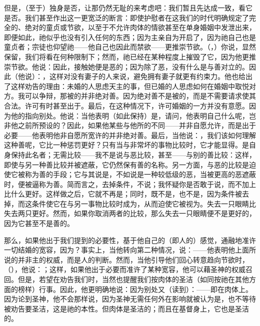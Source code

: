 但是，（至于）独身是否，让那仍然无耻的来考虑吧：我们暂且先达成一致，看它是否。我们甚至作出这一更宽泛的断言：即使护慰者在这我们的时代明确规定了完全的、绝对的童贞或节欲，以至于不允许肉体的情欲甚至在单身婚姻中发泄出来，即便如此，祂似乎也没有引入任何的东西；因为主亲自为开启了，因为祂自己也是童贞者；宗徒也仰望祂——他自己也因此而禁欲——更推崇节欲。（，）你说，显然保留，我们将看在何种限制下；然而，祂已经在某种程度上摧毁了它，因为他更推崇节欲。他说：因此，接触她便是恶的；因为除了恶，没有什么是与善对立的。因此（他说）：，这样对没有妻子的人来说，避免拥有妻子就更有约束力。他也给出了这样劝告的理由：未婚的人思虑天主的事，但已婚的人思虑如何在婚姻中取悦对方。我可以争辩，那被的并非绝对善。因为绝对善不是被的，而是不需要请求使其合法。许可有时甚至出于。最后，在这种情况下，许可婚姻的一方并没有意愿。因为他的指向别处。他说：当他表明（如此保持）是，请问，他表明自己什么呢，岂非他之前所预设的？因此，如果他某些与他所的不同——并非自愿允许，而是出于必要——他表明他非自愿所宽许的并非绝对善。最后，当他说：，我们该如何理解这种善呢，它比一种惩罚更好？只有当与非常坏的事物比较时，它才能显得。是自身保持此名者；无需比较——我不是说与恶比较，甚至——与别的善比较：这样，即使与另一种善比较并被遮蔽，它仍然保有善的名称。另一方面，与恶的比较是迫使它被称为善的手段；它与其说是，不如说是一种较低级的恶，当被更高的恶遮蔽时，便被逼称为善。简而言之，去掉条件，不说；我怀疑你是否敢于说，而不加上比什么更好。这样做之后，它就不再是；同时，既不是，也不是，因为条件被去掉，而这条件使它在与另一事物比较时成为，从而迫使它被视为。失去一只眼睛比失去两只更好。然而，如果你取消两者的比较，那么失去一只眼睛便不是更好的，因为它甚至不是善的。\par

那么，如果他出于我们提到的必要性，基于他自己的（即人的）感觉，通融地准许一切结婚的宽容，因为？事实上，当他转向第二种情况，说：——他表明他上面所说的并非主的权威，而是人的判断。然而，当他引导他们回心转意趋向节欲时，（），他说：；这样，如果他出于必要而准许了某种宽容，他可以藉圣神的权威召回。但是，若望在劝告我们时，当然也提醒我们按肉体的圣洁（如同按祂在其他方面的榜样）行事。因此，他更明确地说：因为别处又（读到）：——即在肉体上。因为论到圣神，他不会那样说，因为圣神无需任何外在影响就被认为是，也不等待被劝告要圣洁，这是祂的本性。但肉体是圣洁的；而且在基督身上，它也是圣洁的。\par

